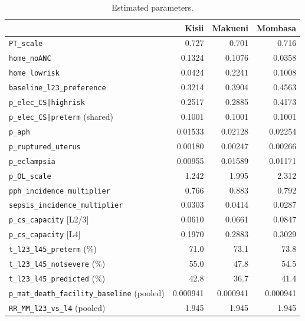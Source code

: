 \documentclass[11pt]{article}
\newcommand{\p}[1]{\texttt{#1}}
\begin{document}
\begin{table}[htbp]
\centering
\caption{Estimated parameters.}
\label{tab:params}
\begin{tabular}{lrrr}
\toprule
 & Kisii & Makueni & Mombasa \\
\midrule
\p{PT\_scale} & 0.727 & 0.701 & 0.716 \\
\p{home\_noANC} & 0.1324 & 0.1076 & 0.0358 \\
\p{home\_lowrisk} & 0.0424 & 0.2241 & 0.1008 \\
\p{baseline\_l23\_preference} & 0.3214 & 0.3904 & 0.4563 \\
\p{p\_elec\_CS|highrisk} & 0.2517 & 0.2885 & 0.4173 \\
\p{p\_elec\_CS|preterm} (shared) & 0.1001 & 0.1001 & 0.1001 \\
\p{p\_aph} & 0.01533 & 0.02128 & 0.02254 \\
\p{p\_ruptured\_uterus} & 0.00180 & 0.00247 & 0.00266 \\
\p{p\_eclampsia} & 0.00955 & 0.01589 & 0.01171 \\
\p{p\_OL\_scale} & 1.242 & 1.995 & 2.312 \\
\p{pph\_incidence\_multiplier} & 0.766 & 0.883 & 0.792 \\
\p{sepsis\_incidence\_multiplier} & 0.0303 & 0.0414 & 0.0287 \\
\p{p\_cs\_capacity} [L2/3] & 0.0610 & 0.0661 & 0.0847 \\
\p{p\_cs\_capacity} [L4] & 0.1970 & 0.2883 & 0.3029 \\
\p{t\_l23\_l45\_preterm} (\%) & 71.0 & 73.1 & 73.8 \\
\p{t\_l23\_l45\_notsevere} (\%) & 55.0 & 47.8 & 54.5 \\
\p{t\_l23\_l45\_predicted} (\%) & 42.8 & 36.7 & 41.4 \\
\p{p\_mat\_death\_facility\_baseline} (pooled) & 0.000941 & 0.000941 & 0.000941 \\
\p{RR\_MM\_l23\_vs\_l4} (pooled) & 1.945 & 1.945 & 1.945 \\
\bottomrule
\end{tabular}
\end{table}
\end{document}
